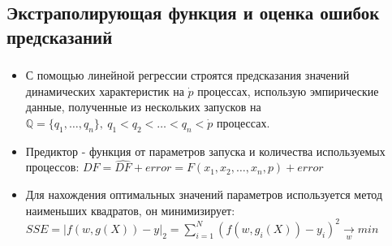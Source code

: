 \documentclass[unicode, t, 11pt]{beamer}%
\begin{document}
		\subsection{Экстраполирующая функция и оценка ошибок предсказаний}
			\begin{frame}
				\frametitle{\insertsection}
					\framesubtitle{\insertsubsection}
					\begin{itemize}[label = \(\bullet\)]
						\item С помощью линейной регрессии строятся предсказания значений динамических характеристик на \(\dot{p}\) процессах, использую эмпирические данные, полученные из нескольких запусков на \(\mathbb{Q} = \{q_1,\ldots, q_n\},\ q_1 < q_2 < \ldots < q_n < \dot{p}\) процессах.
						\item Предиктор - функция от параметров запуска и количества используемых процессов: \(\label{main_formula}DF = \hat{DF} + error = F(x_1, x_2, \ldots, x_n, p) + error\)
						\item Для нахождения оптимальных значений параметров используется метод наименьших квадратов, он минимизирует: \(SSE = |f(w, g(X)) - y|_2 = \sum_{i = 1}^{N}{(f(w, g_i(X)) - y_i)^2 \xrightarrow[w]{} min}\)
					\end{itemize}
			\end{frame}
\end{document}
